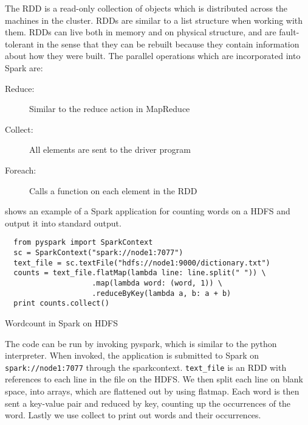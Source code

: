 The RDD is a read-only collection of objects which is distributed across the machines in the cluster. RDDs are similar to a list structure when working with them. RDDs can live both in memory and on physical structure, and are fault-tolerant in the sense that they can be rebuilt because they contain information about how they were built. The parallel operations which are incorporated into Spark are: 
\begin{description}
  \item[Reduce:] Similar to the reduce action in MapReduce 
  \item[Collect:] All elements are sent to the driver program
  \item[Foreach:] Calls a function on each element in the RDD
\end{description}
 shows an example of a Spark application for counting words on a HDFS and output it into standard output.
\begin{listing}[H]
\begin{verbatim}
  from pyspark import SparkContext
  sc = SparkContext("spark://node1:7077")
  text_file = sc.textFile("hdfs://node1:9000/dictionary.txt")
  counts = text_file.flatMap(lambda line: line.split(" ")) \
                    .map(lambda word: (word, 1)) \
                    .reduceByKey(lambda a, b: a + b)
  print counts.collect()
  \end{verbatim}
  \caption{Wordcount in Spark on HDFS}
  \label{lst:wordcount}
\end{listing} 
The code can be run by invoking pyspark, which is similar to the python interpreter. When invoked, the application is submitted to Spark on \texttt{spark://node1:7077} through the sparkcontext. \texttt{text\_file} is an RDD with references to each line in the file on the HDFS. We then split each line on blank space, into arrays, which are flattened out by using flatmap. Each word is then sent a key-value pair and reduced by key, counting up the occurrences of the word. Lastly we use collect to print out words and their occurrences.





